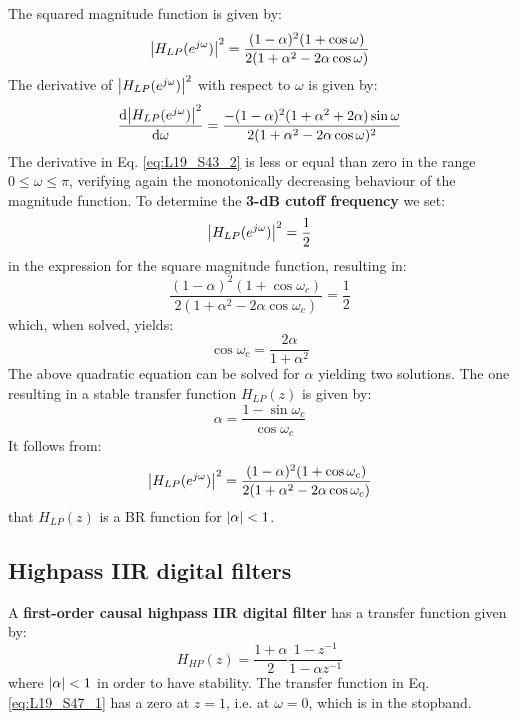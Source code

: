 \documentclass[../../main/main.tex]{subfiles}
\begin{document}
The squared magnitude function is given by:
\begin{equation}
    \abs{H_{LP}(e^{j\omega})}^{2}
    =
    \frac{(1-\alpha)^{2}(1 + \cos\omega)}{2(1 + \alpha^{2} - 2\alpha\cos\omega)}
    \label{eq:L19_S43_1}
\end{equation}
The derivative of \( \abs{H_{LP}(e^{j\omega})}^{2} \) with respect to \( \omega \) is given by:
\begin{equation}
    \dv{\abs{H_{LP}(e^{j\omega})}^{2}}{\omega}
    =
    \frac{-(1-\alpha)^{2} (1 + \alpha^{2} + 2\alpha) \sin\omega}{2(1 + \alpha^{2} - 2\alpha\cos\omega)^{2}}
    \label{eq:L19_S43_2}
\end{equation}
The derivative in Eq. \ref{eq:L19_S43_2} is less or equal than zero in the range \( 0 \le \omega \le \pi \), verifying again the monotonically decreasing behaviour of the magnitude function. To determine the \textbf{3-dB cutoff frequency} we set:
\begin{equation}
    \abs{H_{LP}(e^{j\omega})}^{2}
    =
    \frac{1}{2}
    \label{eq:L19_S44_1}
\end{equation}
in the expression for the square magnitude function, resulting in:
\begin{equation}
    \frac{(1 - \alpha)^{2}(1 + \cos\omega_{c})}{2(1 + \alpha^{2} - 2\alpha\cos\omega_{c})}
    =
    \frac{1}{2}
    \label{eq:L19_S44_2}
\end{equation}
which, when solved, yields:
\begin{equation}
    \cos\omega_{c}
    =
    \frac{2\alpha}{1 + \alpha^{2}}
    \label{eq:L19_S45_1}
\end{equation}
The above quadratic equation can be solved for \( \alpha \) yielding two solutions. The one resulting in a stable transfer function \( H_{LP}(z) \) is given by:
\begin{equation}
    \alpha
    =
    \frac{1 - \sin\omega_{c}}{\cos\omega_{c}}
    \label{eq:L19_S46_1}
\end{equation}
It follows from:
\begin{equation}
    \abs{H_{LP}(e^{j\omega})}^{2}
    =
    \frac{(1-\alpha)^{2}(1 + \cos\omega_{c})}{2(1 + \alpha^{2} - 2\alpha\cos\omega_{c})}
    \label{eq:L19_S46_2}
\end{equation}
that \( H_{LP}(z) \) is a BR function for \( \abs{\alpha} < 1 \).



\subsection{Highpass IIR digital filters}
A \textbf{first-order causal highpass IIR digital filter} has a transfer function given by:
\begin{equation}
    H_{HP}(z)
    =
    \frac{1 + \alpha}{2} \frac{1 - z^{-1}}{1 - \alpha z^{-1}}
    \label{eq:L19_S47_1}
\end{equation}
where \( \abs{\alpha} < 1 \) in order to have stability. The transfer function in Eq. \ref{eq:L19_S47_1} has a zero at \( z = 1 \), i.e. at \( \omega = 0 \), which is in the stopband.
\end{document}

